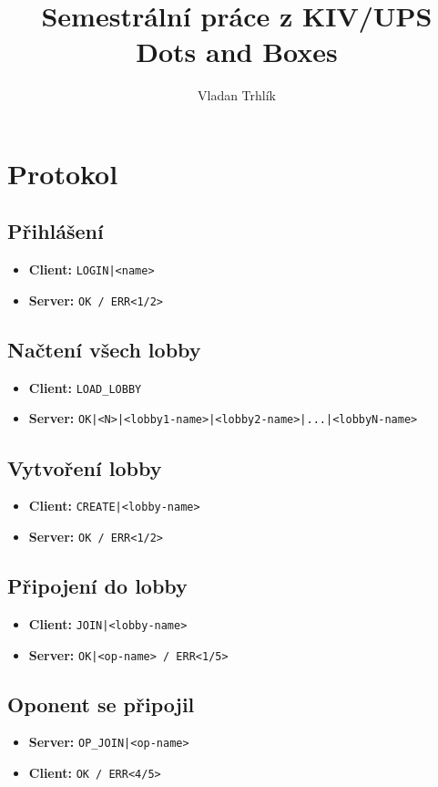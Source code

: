 \documentclass[11pt,a4paper]{article}
\author{Vladan Trhlík}
\title{ %
	Semestrální práce z KIV/UPS \\
	\large Dots and Boxes  \\
}
\begin{document}
\maketitle

\section{Protokol}

\subsection*{Přihlášení}
\begin{itemize}
	\item \textbf{Client:} \texttt{LOGIN|<name>}
	\item \textbf{Server:} \texttt{OK / ERR<1/2>}
\end{itemize}

\subsection*{Načtení všech lobby}
\begin{itemize}
	\item \textbf{Client:} \texttt{LOAD\_LOBBY}
	\item \textbf{Server:} \texttt{OK|<N>|<lobby1-name>|<lobby2-name>|...|<lobbyN-name>}
\end{itemize}

\subsection*{Vytvoření lobby}
\begin{itemize}
	\item \textbf{Client:} \texttt{CREATE|<lobby-name>}
	\item \textbf{Server:} \texttt{OK / ERR<1/2>}
\end{itemize}

\subsection*{Připojení do lobby}
\begin{itemize}
	\item \textbf{Client:} \texttt{JOIN|<lobby-name>}
	\item \textbf{Server:} \texttt{OK|<op-name> / ERR<1/5>}
\end{itemize}

\subsection*{Oponent se připojil}
\begin{itemize}
	\item \textbf{Server:} \texttt{OP\_JOIN|<op-name>}
	\item \textbf{Client:} \texttt{OK / ERR<4/5>}
\end{itemize}
\end{document}

